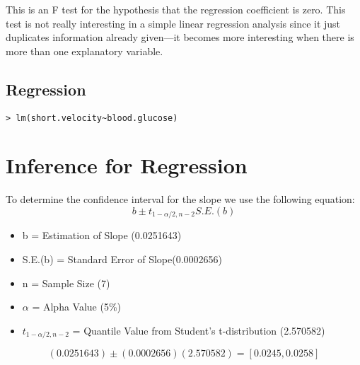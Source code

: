 This is an F test for the hypothesis that the regression coefficient is zero. This test is not really interesting in a
simple linear regression analysis since it just duplicates information already given—it becomes more interesting when there is more than one explanatory variable.

\subsection{Regression}

\begin{verbatim}
> lm(short.velocity~blood.glucose)
\end{verbatim}

\section{Inference for Regression}
To determine the confidence interval for the slope we use the
following equation:
\begin{equation}
b \pm t_{1-\alpha/2,n-2} S.E.(b)
\end{equation}

\begin{itemize}
\item b = Estimation of Slope (0.0251643) \item S.E.(b) = Standard
Error of Slope(0.0002656) \item n = Sample Size (7) \item $\alpha$
= Alpha Value (5\%) \item $t_{1-\alpha/2,n-2}$ = Quantile Value
from Student’s t-distribution (2.570582)
\end{itemize}

\begin{equation}
(0.0251643) \pm (0.0002656)(2.570582) = [ 0.0245,0.0258 ]
\end{equation}








